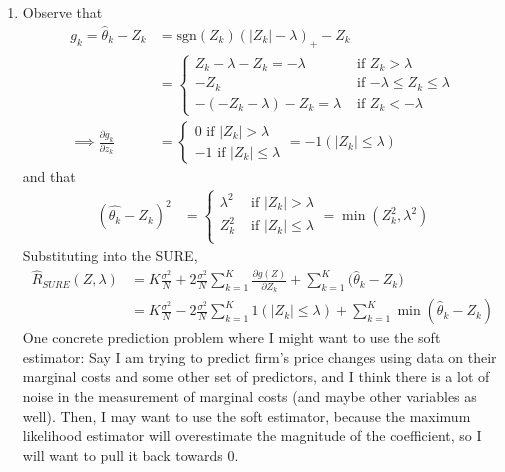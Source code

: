 \documentclass{article}[12pt]
\begin{document}
\begin{enumerate}
    \item Observe that
    \begin{align*}
        g_k = \hat{\theta}_k - Z_k  &= \text{sgn}(Z_k) (|Z_k| - \lambda)_+ - Z_k \\
        &=
        \begin{cases}
            Z_k - \lambda - Z_k = -\lambda &\mbox{ if $Z_k > \lambda$} \\
            - Z_k &\mbox{ if $-\lambda \leq Z_k \leq \lambda$} \\
            -( - Z_k - \lambda) - Z_k = \lambda &\mbox{ if $Z_k < -\lambda$}
        \end{cases}\\
        \implies \frac{\partial g_k}{\partial z_k} &=
        \begin{cases}
            0 \mbox{ if $|Z_k| > \lambda$} \\
            -1 \mbox{ if $|Z_k| \leq \lambda$}
        \end{cases} = -1(|Z_k| \leq \lambda)
    \end{align*}
    and that
    \begin{align*}
        (\hat{\theta_k} - Z_k)^2 &=
        \begin{cases}
            \lambda^2 &\mbox{ if $|Z_k| > \lambda$} \\
            Z_k^2 &\mbox{ if $|Z_k| \leq \lambda$} \\
        \end{cases}
        = \min (Z_k^2, \lambda^2)
    \end{align*}
    Substituting into the SURE,
    \begin{align*}
        \hat{R}_{SURE} (Z, \lambda) &= K \frac{\sigma^2}{N} + 2 \frac{\sigma^2}{N} \sum_{k=1}^K \frac{\partial g(Z)}{\partial Z_k} + \sum_{k=1}^K \bigg( \hat{\theta}_k- Z_k \bigg) \\
        &= K \frac{\sigma^2}{N} - 2 \frac{\sigma^2}{N} \sum_{k=1}^K 1(|Z_k| \leq \lambda) + \sum_{k=1}^K \min (\hat{\theta}_k - Z_k )
    \end{align*}
    One concrete prediction problem where I might want to use the soft estimator: Say I am trying to predict firm's price changes using data on their marginal costs and some other set of predictors, and I think there is a lot of noise in the measurement of marginal costs (and maybe other variables as well). Then, I may want to use the soft estimator, because the maximum likelihood estimator will overestimate the magnitude of the coefficient, so I will want to pull it back towards 0.


\end{enumerate}
\end{document}
